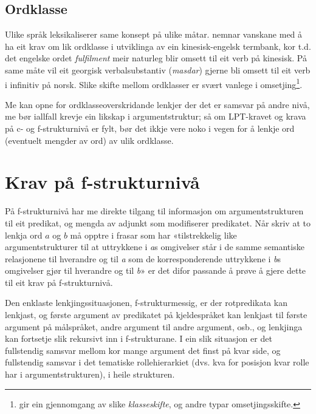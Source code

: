 \documentclass[11pt,a4paper,oneside,draft]{book}
\begin{document}
\subsection{Ordklasse}
\label{sec-3.5.1}

Ulike språk leksikaliserer same konsept på ulike
måtar. \citet[s.~3]{cheung2002scg} nemnar vanskane med å ha eit krav
om lik ordklasse i utviklinga av ein kinesisk-engelsk termbank, kor
t.d. det engelske ordet \emph{fulfilment} meir naturleg blir omsett til eit
verb på kinesisk. På same måte vil eit georgisk verbalsubstantiv
(\emph{masdar}) gjerne bli omsett til eit verb i infinitiv på
norsk. Slike skifte mellom ordklasser er svært vanlege i
omsetjing\footnote{\citet[Catford~(1965),~i][s.~61]{munday2001its} gir ein gjennomgang av
       slike \emph{klasseskifte}, og andre typar omsetjingsskifte. }.

Me kan opne for ordklasseoverskridande lenkjer der det er samsvar på
andre nivå, me bør iallfall krevje ein likskap i argumentstruktur; så
om LPT-kravet og krava på c- og f-strukturnivå er fylt, bør det ikkje
vere noko i vegen for å lenkje ord (eventuelt mengder av ord) av ulik
ordklasse.


\section{Krav på f-strukturnivå}
\label{sec-3.6}

 
På f-strukturnivå har me direkte tilgang til informasjon om
argumentstrukturen til eit predikat, og mengda av adjunkt som
modifiserer predikatet. Når \citet[s.~3]{thunes2003eal} skriv at to
lenkja ord $a$ og $b$ må opptre i frasar som har «tilstrekkelig like
argumentstrukturer til at uttrykkene i \emph{a}s omgivelser står i de
samme semantiske relasjonene til hverandre og til \emph{a} som de
korresponderende uttrykkene i \emph{b}s omgivelser gjør til hverandre
og til \emph{b}» er det difor passande å prøve å gjere dette til eit
krav på f-strukturnivå.

Den enklaste lenkjingssituasjonen, f-strukturmessig, er der
rotpredikata kan lenkjast, og første argument av predikatet på
kjeldespråket kan lenkjast til første argument på målspråket, andre
argument til andre argument, osb., og lenkjinga kan fortsetje slik
rekursivt inn i f-strukturane. I ein slik situasjon er det fullstendig
samsvar mellom kor mange argument det finst på kvar side, og
fullstendig samsvar i det tematiske rollehierarkiet (dvs. kva for
posisjon kvar rolle har i argumentstrukturen), i heile strukturen.
\end{document}
